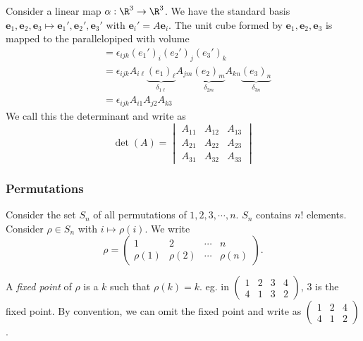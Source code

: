 \documentclass[a4paper]{article}
\begin{document}
Consider a linear map $\alpha: \R^3\to \R^3$. We have the standard basis $\mathbf{e}_1, \mathbf{e}_2, \mathbf{e}_3\mapsto \mathbf{e}_1', \mathbf{e}_2', \mathbf{e}_3'$ with $\mathbf{e}_i' = A\mathbf{e}_i$. The unit cube formed by $\mathbf{e}_1, \mathbf{e}_2, \mathbf{e}_3$ is mapped to the parallelopiped with volume
\begin{align*}
  [\mathbf{e}_1', \mathbf{e}_2', \mathbf{e}_3'] &= \epsilon_{ijk}(e_1')_i (e_2')_j (e_3')_k\\
  &= \epsilon_{ijk} A_{i\ell} \underbrace{(e_1)_\ell}_{\delta_{1\ell}} A_{jm}\underbrace{(e_2)_m}_{\delta_{2m}} A_{kn}\underbrace{(e_3)_n}_{\delta_{3n}}\\
  &= \epsilon_{ijk} A_{i1}A_{j2}A_{k3}
\end{align*}
We call this the determinant and write as
\[
  \det(A) = \begin{vmatrix} A_{11} & A_{12} & A_{13}\\A_{21} & A_{22} & A_{23} \\ A_{31} & A_{32} & A_{33}\end{vmatrix}
\]

\subsubsection{Permutations}

\begin{notation}
  Consider the set $S_n$ of all permutations of $1, 2, 3, \cdots , n$. $S_n$ contains $n!$ elements. Consider $\rho\in S_n$ with $i \mapsto \rho(i)$. We write
  \[
    \rho = \begin{pmatrix} 1 & 2 & \cdots & n\\ \rho(1) & \rho (2) &\cdots & \rho (n)\end{pmatrix}.
  \]
\end{notation}

\begin{defi}
  A \emph{fixed point} of $\rho$ is a $k$ such that $\rho(k) = k$. eg. in $\begin{pmatrix} 1 & 2 & 3 & 4\\4 & 1 & 3 & 2\end{pmatrix}$, $3$ is the fixed point. By convention, we can omit the fixed point and write as $\begin{pmatrix} 1 & 2 & 4\\ 4 & 1 & 2\end{pmatrix}$.
\end{defi}
\end{document}
